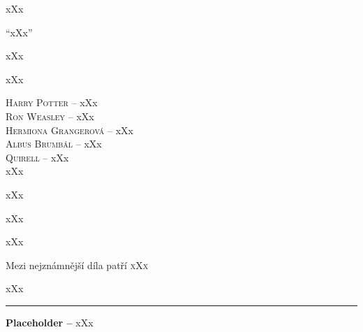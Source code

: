 \documentclass{extarticle} %
\begin{document}
\noindent xXx



\noindent 
\enquote{xXx}

\noindent 
xXx

\noindent 
xXx

\noindent 
\textsc{Harry Potter --} xXx \\
\textsc{Ron Weasley --} xXx \\
\textsc{Hermiona Grangerová --} xXx \\
\textsc{Albus Brumbál --} xXx \\
\textsc{Quirell --} xXx \\

\noindent 
xXx

\noindent 
xXx

\noindent 
xXx






\noindent 
xXx


\noindent 
Mezi nejznámnější díla patří \textsc{xXx}






\noindent 
xXx

\vfill

\noindent\begin{minipage}{\textwidth}
    {\textcolor{\wpagecolor}{\rule{\linewidth}{0.4pt}}
    \footnotesize
    \textbf{Placeholder --} xXx
    }
\end{minipage}
\end{document}
